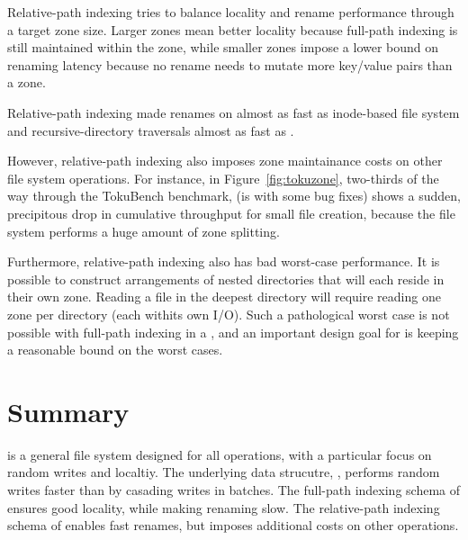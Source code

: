 Relative-path indexing tries to balance locality and rename performance through
a target zone size.
Larger zones mean better locality because full-path indexing is still maintained
within the zone, while smaller zones impose a lower bound on renaming latency
because no rename needs to mutate more key/value pairs than a zone.

Relative-path indexing made renames on \betrfsTwo almost as fast as inode-based
file system and recursive-directory traversals almost as fast as \betrfsOne.

However, relative-path indexing also imposes zone maintainance costs on other
file system operations.
For instance, in Figure~\ref{fig:tokuzone}, two-thirds of the way through the
TokuBench benchmark, \betrfsThree (\betrfsThree is \betrfsTwo with some bug
fixes) shows a sudden, precipitous drop in cumulative
throughput for small file creation, because the file system performs a huge
amount of zone splitting.

Furthermore, relative-path indexing also has bad worst-case performance.
It is possible to construct arrangements of nested directories that will each
reside in their own zone.
Reading a file in the deepest directory will require reading one zone per
directory (each withits own I/O).
Such a pathological worst case is not possible with full-path indexing in a
\bet, and an important design goal for \betrfs is keeping a reasonable bound on
the worst cases.

\section{Summary}

\betrfs is a general file system designed for all operations, with a particular
focus on random writes and localtiy.
The underlying data strucutre, \bets, performs random writes faster than \btrees
by casading writes in batches.
The full-path indexing schema of \betrfsOne ensures good locality, while making
renaming slow.
The relative-path indexing schema of \betrfsTwo enables fast renames,
but imposes additional costs on other operations.

